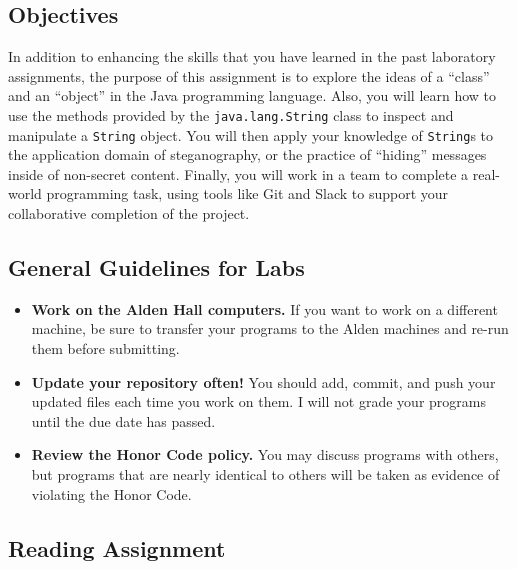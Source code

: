 



\subsection*{Objectives}
\vspace{-0.05in}

In addition to enhancing the skills that you have learned in the past laboratory assignments, the purpose of this
assignment is to explore the ideas of a ``class'' and an ``object'' in the Java programming language.  Also, you
will learn how to use the methods provided by the {\tt java.lang.String} class to inspect and manipulate a {\tt String}
object. You will then apply your knowledge of {\tt String}s to the application domain of steganography, or the practice
of ``hiding'' messages inside of non-secret content. Finally, you will work in a team to complete a real-world
programming task, using tools like Git and Slack to support your collaborative completion of the project.

\subsection*{General Guidelines for Labs}
\vspace{-0.05in}
\begin{itemize}
\item
{\bf Work on the Alden Hall computers.} If you want to work on a different
machine, be sure to transfer your programs to the Alden
machines and re-run them before submitting.
\item
{\bf Update your repository often!} You should add, commit,
and push your updated files each time you work on them.  I will not grade
your programs until the due date has passed.
\item
{\bf Review the Honor Code policy.} You
may discuss programs with others, but programs that are nearly identical
to others will be taken as evidence of violating the Honor Code.
\end{itemize}

\vspace{-0.1in}
\subsection*{Reading Assignment}
\vspace{-0.05in}

